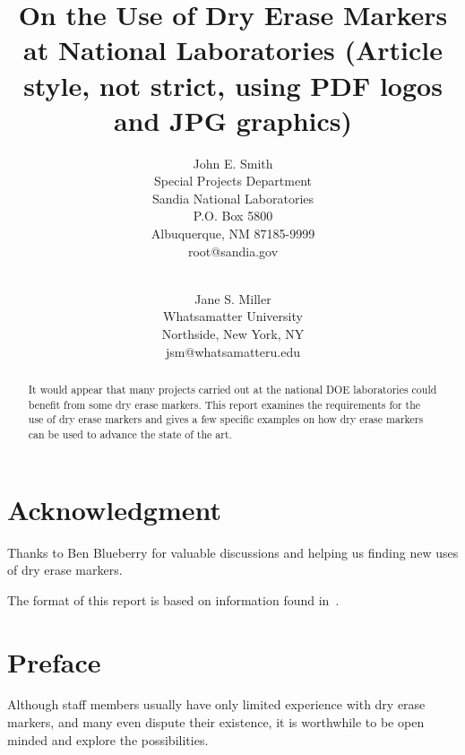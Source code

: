 \documentclass[pdf,ps2pdf,12pt]{SANDreport}
\title{On the Use of Dry Erase Markers at National Laboratories (Article style, not strict,
	using PDF logos and JPG graphics)}
\author{John E. Smith \\
	  Special Projects Department \\
	  Sandia National Laboratories\\
	  P.O. Box 5800\\
	  Albuquerque, NM 87185-9999 \\
	  root@sandia.gov \\
	  \\
	  \and
	  Jane S. Miller \\
	  Whatsamatter University \\
	  Northside, New York, NY\\
	  jsm@whatsamatteru.edu
	 }
\date{}
\begin{document}
    \maketitle

    \begin{abstract}
	It would appear that many projects carried out at the
	national DOE laboratories could benefit from some dry erase markers. This
	report examines the requirements for the use of dry erase markers and
	gives a few specific examples on how dry erase markers can be used to
	advance the state of the art.
    \end{abstract}


    \clearpage
    \section*{Acknowledgment}
	Thanks to Ben Blueberry for valuable discussions and helping
	us finding new uses of dry erase markers.

	The format of this report is based on information found
	in~\cite{Sand98-0730}.


    \cleardoublepage		%
    \tableofcontents
    \listoffigures
    \listoftables


    \clearpage
    \section*{Preface}
	Although staff members usually have only limited experience with
	dry erase markers, and many even dispute their existence, it is worthwhile
	to be open minded and explore the possibilities.
\end{document}
